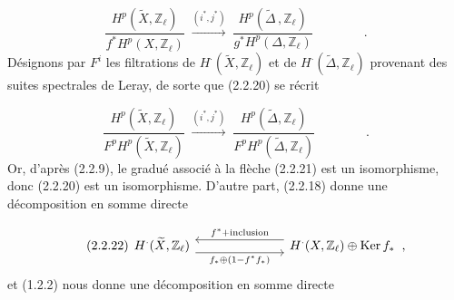\begin{equation}\tag{2.2.20}
\frac{H^{p}(\widetilde{X},\mathbb{Z}_{\ell})}{f^{*}H^{p}(X,\mathbb{Z}_{\ell})} \;\stackrel{(i^{*},j^{*})}{\longrightarrow}\; \frac{H^{p}(\widetilde{\Delta}\,,\mathbb{Z}_{\ell})}{g^{*}H^{p}(\Delta,\mathbb{Z}_{\ell})} \qquad\qquad .
\end{equation}
Désignons par $F^{i}$ les filtrations de $H^{\cdot}(\widetilde{X},\mathbb{Z}_{\ell})$ et de $H^{\cdot}(\widetilde{\Delta},\mathbb{Z}_{\ell})$ provenant des suites spectrales de Leray, de sorte que (2.2.20) se récrit 



\begin{equation}\tag{2.2.21}
\frac{H^{p}(\widetilde{X},\mathbb{Z}_{\ell})}{F^{p}H^{p}(\widetilde{X},\mathbb{Z}_{\ell})} \;\stackrel{(i^{*},j^{*})}{\longrightarrow}\; \frac{H^{p}(\widetilde{\Delta},\mathbb{Z}_{\ell})}{F^{p}H^{p}(\widetilde{\Delta},\mathbb{Z}_{\ell})} \qquad\qquad .
\end{equation}
Or, d'après (2.2.9), le gradué associé à la flèche (2.2.21) est un isomorphisme, donc (2.2.20) est un isomorphisme. D'autre part, (2.2.18) donne une décomposition en somme directe

\begin{equation}\tag{2.2.22}
\begin{tikzcd}[column sep=7em]
H^{\cdot}(\widetilde{X},\mathbb{Z}_{\ell}) \arrow[r, shift right=1.2ex, "f_{*}\oplus(1-f^{*}f_{*})"'] & H^{\cdot}(X,\mathbb{Z}_{\ell}) \oplus \mathrm{Ker}\, f_{*} \;\;, \arrow[l, shift right=1.2ex, "f^{*}+\mathrm{inclusion}"']
\end{tikzcd}
\end{equation}
et (1.2.2) nous donne une décomposition en somme directe

